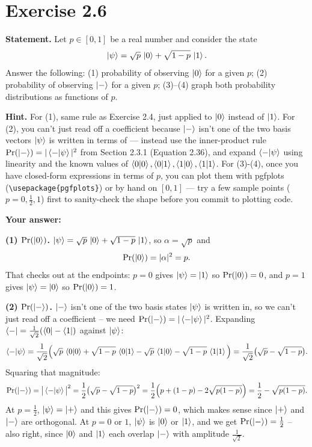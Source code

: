 \documentclass[11pt]{article}
\begin{document}
\section*{Exercise 2.6}
\textbf{Statement.} Let $p \in [0,1]$ be a real number and consider the state
\[
\ket{\psi} = \sqrt{p}\,\ket{0} + \sqrt{1-p}\,\ket{1}.
\]
Answer the following: (1) probability of observing $\ket{0}$ for a given $p$; (2) probability of observing $\ket{-}$ for a given $p$; (3)--(4) graph both probability distributions as functions of $p$.

\textbf{Hint.} For (1), same rule as Exercise 2.4, just applied to $\ket{0}$ instead of $\ket{1}$. For (2), you can't just read off a coefficient because $\ket{-}$ isn't one of the two basis vectors $\ket{\psi}$ is written in terms of — instead use the inner-product rule $\Pr(\ket{-}) = |\braket{-|\psi}|^2$ from Section 2.3.1 (Equation 2.36), and expand $\braket{-|\psi}$ using linearity and the known values of $\braket{0|0},\braket{0|1},\braket{1|0},\braket{1|1}$. For (3)-(4), once you have closed-form expressions in terms of $p$, you can plot them with pgfplots (\texttt{\textbackslash usepackage\{pgfplots\}}) or by hand on $[0,1]$ — try a few sample points ($p=0,\tfrac12,1$) first to sanity-check the shape before you commit to plotting code.

\textbf{Your answer:}

\textbf{(1) $\Pr(\ket0)$.} $\ket\psi = \sqrt p\,\ket0 + \sqrt{1-p}\,\ket1$, so $\alpha = \sqrt p$ and
\[
\Pr(\ket{0}) = |\alpha|^2 = p.
\]
That checks out at the endpoints: $p=0$ gives $\ket\psi=\ket1$ so $\Pr(\ket0)=0$, and $p=1$ gives $\ket\psi=\ket0$ so $\Pr(\ket0)=1$.

\textbf{(2) $\Pr(\ket-)$.} $\ket-$ isn't one of the two basis states $\ket\psi$ is written in, so we can't just read off a coefficient -- we need $\Pr(\ket{-}) = |\braket{-|\psi}|^2$. Expanding $\bra{-} = \frac{1}{\sqrt2}(\bra0-\bra1)$ against $\ket\psi$:
\[
\braket{-|\psi} = \frac{1}{\sqrt2}\Big(\sqrt p\,\braket{0|0} + \sqrt{1-p}\,\braket{0|1} - \sqrt p\,\braket{1|0} - \sqrt{1-p}\,\braket{1|1}\Big)
= \frac{1}{\sqrt2}\big(\sqrt p - \sqrt{1-p}\big).
\]
Squaring that magnitude:
\[
\Pr(\ket{-}) = \big|\braket{-|\psi}\big|^2 = \frac12\big(\sqrt p-\sqrt{1-p}\big)^2
= \frac12\Big(p + (1-p) - 2\sqrt{p(1-p)}\Big)
= \frac12 - \sqrt{p(1-p)}.
\]
At $p=\tfrac12$, $\ket\psi=\ket+$ and this gives $\Pr(\ket-)=0$, which makes sense since $\ket+$ and $\ket-$ are orthogonal. At $p=0$ or $1$, $\ket\psi$ is $\ket0$ or $\ket1$, and we get $\Pr(\ket-)=\tfrac12$ -- also right, since $\ket0$ and $\ket1$ each overlap $\ket-$ with amplitude $\tfrac{1}{\sqrt2}$.
\end{document}
